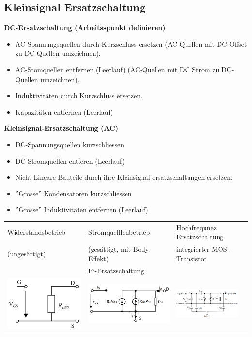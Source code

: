 \subsection{Kleinsignal Ersatzschaltung}
\begin{minipage}{0.5\linewidth}
\textbf{DC-Ersatzschaltung (Arbeitsspunkt definieren)}
    \begin{itemize}[noitemsep,topsep=0pt]
        \item AC-Spannungsquellen durch Kurzschluss ersetzen (AC-Quellen mit DC Offset zu DC-Quellen umzeichnen).
        \item AC-Stomquellen entfernen (Leerlauf)
        (AC-Quellen mit DC Strom zu DC-Quellen umzeichnen).
        \item Induktivitäten durch Kurzschluss ersetzen.
        \item Kapazitäten entfernen (Leerlauf)
    \end{itemize}
\end{minipage}%
\begin{minipage}{0.5\linewidth}
\textbf{Kleinsignal-Ersatzschaltung (AC)}
    \begin{itemize}[noitemsep,topsep=0pt]
        \item DC-Spannungsquellen kurzschliessen
        \item DC-Stromquellen entferen (Leerlauf)
        \item Nicht Lineare Bauteile durch ihre Kleinsignal-ersatzschaltungen ersetzen.
        \item ''Grosse'' Kondensatoren kurzschliessen
        \item ''Grosse'' Induktivitäten entfernen (Leerlauf)
    \end{itemize}
\end{minipage}\vspace{5pt}
\begin{tabular}{| l | l | l | l |}
    \hline
    Widerstandsbetrieb   & Stromquelllenbetrieb          & Hochfrequnez Ersatzschaltung \\
    (ungesättigt)        & (gesättigt, mit Body-Effekt)  & integrierter MOS-Transistor \\
    \hline
     & Pi-Ersatzschaltung  & \\
    \includegraphics[width=0.2\linewidth]{Widerstandsbetrieb_Schaltung.png} & \includegraphics[width=0.3\linewidth]{PI_Niederfrequnz_Kleinsignal.png}  & \includegraphics[width=0.3\linewidth]{Hochfrequnzbetrieb_Schaltung.png} \\
    \hline
\end{tabular}
